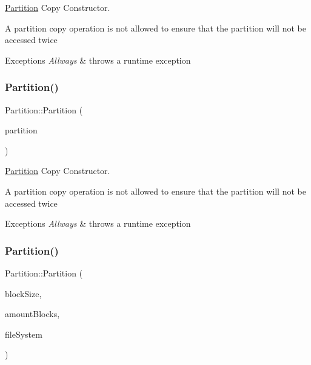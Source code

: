 \mbox{\hyperlink{classlogic_1_1_partition}{Partition}} Copy Constructor. 

A partition copy operation is not allowed to ensure that the partition will not be accessed twice 
\begin{DoxyExceptions}{Exceptions}
{\em Allways} & throws a runtime exception \\
\hline
\end{DoxyExceptions}
\mbox{\label{classlogic_1_1_partition_a019dc9e3d0c13954cd5d72f2049f21fd}} 
\subsubsection{\texorpdfstring{Partition()}{Partition()}\hspace{0.1cm}{\footnotesize\ttfamily [2/3]}}
{\footnotesize\ttfamily Partition\+::\+Partition (\begin{DoxyParamCaption}\item[{\mbox{\hyperlink{classlogic_1_1_partition}{Partition}} \&}]{partition }\end{DoxyParamCaption})\hspace{0.3cm}{\ttfamily [private]}}



\mbox{\hyperlink{classlogic_1_1_partition}{Partition}} Copy Constructor. 

A partition copy operation is not allowed to ensure that the partition will not be accessed twice 
\begin{DoxyExceptions}{Exceptions}
{\em Allways} & throws a runtime exception \\
\hline
\end{DoxyExceptions}
\mbox{\label{classlogic_1_1_partition_ad4a50cfda17b7996c8b1480e8701cf3a}} 
\subsubsection{\texorpdfstring{Partition()}{Partition()}\hspace{0.1cm}{\footnotesize\ttfamily [3/3]}}
{\footnotesize\ttfamily Partition\+::\+Partition (\begin{DoxyParamCaption}\item[{unsigned long long}]{block\+Size,  }\item[{unsigned long long}]{amount\+Blocks,  }\item[{\mbox{\hyperlink{class_i_file_system}{I\+File\+System}} $\ast$}]{file\+System }\end{DoxyParamCaption})}



